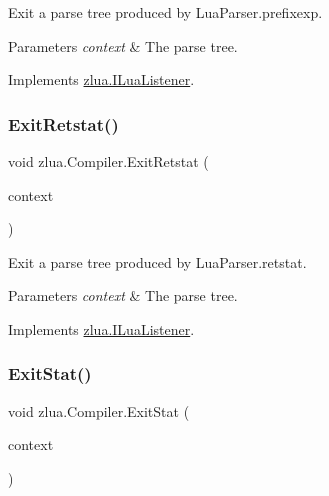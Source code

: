 Exit a parse tree produced by Lua\+Parser.\+prefixexp. 


\begin{DoxyParams}{Parameters}
{\em context} & The parse tree.\\
\hline
\end{DoxyParams}


Implements \mbox{\hyperlink{interfacezlua_1_1_i_lua_listener_a844508765196c91884c10bcaa1a14424}{zlua.\+I\+Lua\+Listener}}.

\mbox{\label{classzlua_1_1_compiler_a53f999661996b7f9c09c021b55545d53}} 
\subsubsection{\texorpdfstring{Exit\+Retstat()}{ExitRetstat()}}
{\footnotesize\ttfamily void zlua.\+Compiler.\+Exit\+Retstat (\begin{DoxyParamCaption}\item[{\mbox{[}\+Not\+Null\mbox{]} \mbox{\hyperlink{classzlua_1_1_lua_parser_1_1_retstat_context}{Lua\+Parser.\+Retstat\+Context}}}]{context }\end{DoxyParamCaption})}



Exit a parse tree produced by Lua\+Parser.\+retstat. 


\begin{DoxyParams}{Parameters}
{\em context} & The parse tree.\\
\hline
\end{DoxyParams}


Implements \mbox{\hyperlink{interfacezlua_1_1_i_lua_listener_a4f4bc76c085e375c69f6c34491670d9e}{zlua.\+I\+Lua\+Listener}}.

\mbox{\label{classzlua_1_1_compiler_a9133673bbea382a79c9936cd804bd438}} 
\subsubsection{\texorpdfstring{Exit\+Stat()}{ExitStat()}}
{\footnotesize\ttfamily void zlua.\+Compiler.\+Exit\+Stat (\begin{DoxyParamCaption}\item[{\mbox{[}\+Not\+Null\mbox{]} \mbox{\hyperlink{classzlua_1_1_lua_parser_1_1_stat_context}{Lua\+Parser.\+Stat\+Context}}}]{context }\end{DoxyParamCaption})}



